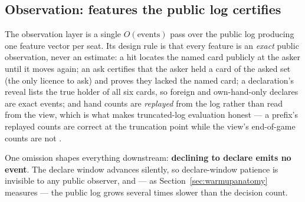 \documentclass[11pt]{article}
\begin{document}
\subsection{Observation: features the public log certifies}
\label{sec:observe}

The observation layer is a single $O(\text{events})$ pass over the public log producing
one feature vector per seat. Its design rule is that every feature is an \emph{exact}
public observation, never an estimate: a hit locates the named card publicly at the asker
until it moves again; an ask certifies that the asker held a card of the asked set (the
only licence to ask) and proves they lacked the named card; a declaration's reveal lists
the true holder of all six cards, so foreign and own-hand-only declares are exact events;
and hand counts are \emph{replayed} from the log rather than read from the view, which is
what makes truncated-log evaluation honest --- a prefix's replayed counts are correct at
the truncation point while the view's end-of-game counts are not \cite{repo}.

One omission shapes everything downstream: \textbf{declining to declare emits no event}.
The declare window advances silently, so declare-window patience is invisible to any
public observer, and --- as Section~\ref{sec:warmupanatomy} measures --- the public log
grows several times slower than the decision count.
\end{document}
